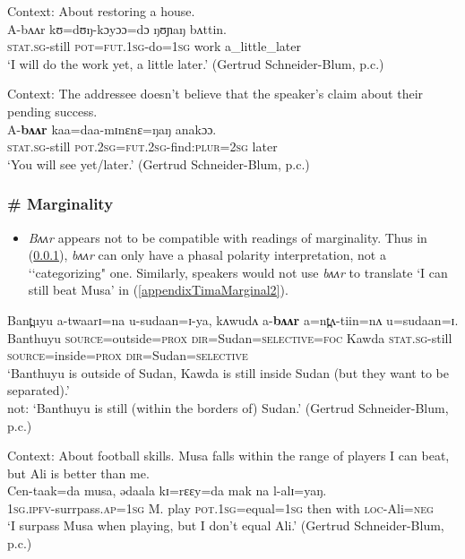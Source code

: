 \begin{exe}
	\ex Context: About restoring a house.\\
	\gll A-bʌʌr 	kʊ=dʊŋ-kɔyɔɔ=dɔ 	ŋʊɲaŋ 	bʌttin.\\
	\textsc{stat}.\textsc{sg}-still \textsc{pot}=\textsc{fut}.1\textsc{sg}-do=1\textsc{sg} work a\_little\_later\\
	\glt \lq I will do the work yet, a little later.\rq{ }(Gertrud Schneider-Blum, p.c.)
	
	\ex Context: The addressee doesn't believe that the speaker's claim about their pending success.\\
	\gll A-\textbf{bʌʌr} kaa=daa-mɪnɛnɛ=ŋaŋ anakɔɔ.\\
	\textsc{stat}.\textsc{sg}-still \textsc{pot}.2\textsc{sg}=\textsc{fut}.2\textsc{sg}-find:\textsc{plur}=2\textsc{sg} later\\
	\glt \lq You will see yet/later.\rq{ }(Gertrud Schneider-Blum, p.c.)
\end{exe}

\subsubsection{\# Marginality}
\label{appendixTimaMarginal}
\begin{itemize}
	\sloppy
	\item \textit{Bʌʌr} appears not to be compatible with readings of marginality. Thus in (\ref{appendixTimaMarginal}),  \textit{bʌʌr} can only have a phasal polarity interpretation, not a \lq\lq categorizing" one. Similarly, speakers would not use \textit{bʌʌr} to translate \lq I can still beat Musa' in (\ref{appendixTimaMarginal2}).
\end{itemize}
\begin{exe}
	\ex\label{appendixTimaMarginal1}
	\gll Bant̪uyu a-twaarɪ=na u-sudaan=ɪ-ya, kʌwudʌ a-\textbf{bʌʌr} a=nt̪ʌ-tiin=nʌ u=sudaan=ɪ.\\
	Banthuyu \textsc{source}=outside=\textsc{prox} \textsc{dir}=Sudan=\textsc{selective}=\textsc{foc} Kawda \textsc{stat}.\textsc{sg}-still \textsc{source}=inside=\textsc{prox} \textsc{dir}=Sudan=\textsc{selective}\\
	\glt \lq Banthuyu is outside of Sudan, Kawda is still inside Sudan (but they want to be separated).'\\
	not: \lq Banthuyu is still (within the borders of) Sudan.\rq{ }(Gertrud Schneider-Blum, p.c.)

	\ex\label{appendixTimaMarginal2}
	Context: About football skills. Musa falls within the range of players I can beat, but Ali is better than me.\\
	\gll Cen-taak=da musa, ədaala kɪ=rɛɛy=da mak na l-alɪ=yaŋ.\\
	1\textsc{sg}.\textsc{ipfv}-surrpass.\textsc{ap}=1\textsc{sg} M. play \textsc{pot}.1\textsc{sg}=equal=1\textsc{sg} then with \textsc{loc}-Ali=\textsc{neg}\\
	\glt \lq I surpass Musa when playing, but I don't equal Ali.\rq{ }(Gertrud Schneider-Blum, p.c.)
\end{exe}

